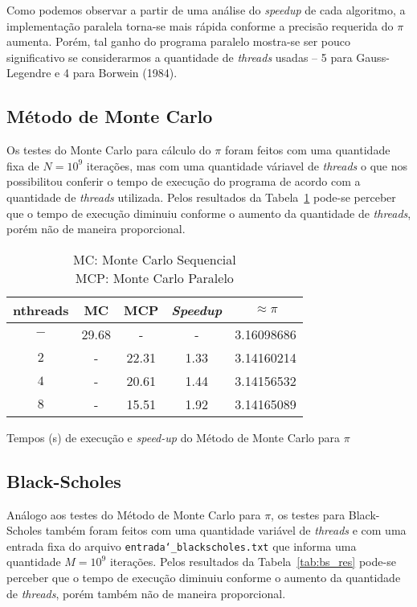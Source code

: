 Como podemos observar a partir de uma análise do \emph{speedup} de cada algoritmo, a implementação paralela torna-se mais rápida conforme a precisão requerida do $\pi$ aumenta. Porém, tal ganho do programa paralelo mostra-se ser pouco significativo se considerarmos a quantidade de \textit{threads} usadas -- 5 para Gauss-Legendre e 4 para Borwein (1984).

\subsection{Método de Monte Carlo}

Os testes do Monte Carlo para cálculo do $\pi$ foram feitos com uma quantidade fixa de $N = 10^9$ iterações, mas com uma quantidade váriavel de \textit{threads} o que nos possibilitou conferir o tempo de execução do programa de acordo com a quantidade de \textit{threads} utilizada. Pelos resultados da Tabela~\ref{tab:mc_res} pode-se perceber que o tempo de execução diminuiu conforme o aumento da quantidade de \textit{threads}, porém não de maneira proporcional.

\begin{table}[h]
\begin{center}
	\begin{tabular}{ |c|c|c|c|c| } 
		\hline
		nthreads & MC & MCP & \textit{Speedup} & $\approx \pi$ \\
		\hline

		$-$ & 29.68 & -      & -    & 3.16098686 \\
		$2$ & -     & 22.31  & 1.33 & 3.14160214 \\
		$4$ & -     & 20.61  & 1.44 & 3.14156532 \\
		$8$ & -     & 15.51  & 1.92 & 3.14165089 \\
		
		\hline
	\end{tabular}
	\caption{Tempos (s) de execução e \emph{speed-up} do Método de Monte Carlo para $\pi$ \label{tab:mc_res}}
	\caption*{
		MC:  Monte Carlo Sequencial\\
		MCP: Monte Carlo Paralelo
	}
\end{center}
\end{table}

\subsection{Black-Scholes}

Análogo aos testes do Método de Monte Carlo para $\pi$, os testes para Black-Scholes também foram feitos com uma quantidade variável de \textit{threads} e com uma entrada fixa do arquivo \texttt{entrada\char`_blackscholes.txt} que informa uma quantidade $M = 10^9$ iterações. Pelos resultados da Tabela~\ref{tab:bs_res} pode-se perceber que o tempo de execução diminuiu conforme o aumento da quantidade de \textit{threads}, porém também não de maneira proporcional.

